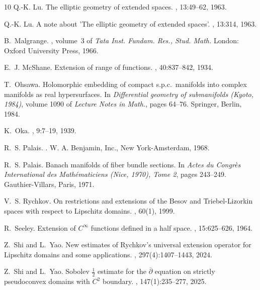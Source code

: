 \documentclass[11pt]{amsart}
\numberwithin{equation}{section}
\theoremstyle{definition}
\begin{document}
\begin{thebibliography}{10}
Q.-K. Lu.
\newblock The elliptic geometry of extended spaces.
, 13:49--62, 1963.

Q.-K. Lu.
\newblock A note about '{The} elliptic geometry of extended spaces'.
, 13:314, 1963.

B.~Malgrange.
, volume~3 of {\em Tata Inst.
  Fundam. Res., Stud. Math.}
\newblock London: Oxford University Press, 1966.

E.~J. McShane.
\newblock Extension of range of functions.
, 40:837--842, 1934.

T.~Ohsawa.
\newblock Holomorphic embedding of compact s.p.c.\ manifolds into complex
  manifolds as real hypersurfaces.
\newblock In {\em Differential geometry of submanifolds ({K}yoto, 1984)},
  volume 1090 of {\em Lecture Notes in Math.}, pages 64--76. Springer, Berlin,
  1984.

K.~{Oka}.
, 9:7--19, 1939.

R.~S. Palais.
.
\newblock W. A. Benjamin, Inc., New York-Amsterdam, 1968.

R.~S. Palais.
\newblock Banach manifolds of fiber bundle sections.
\newblock In {\em Actes du {C}ongr\`es {I}nternational des {M}ath\'ematiciens
  ({N}ice, 1970), {T}ome 2}, pages 243--249. Gauthier-Villars, Paris, 1971.

V.~S. Rychkov.
\newblock On restrictions and extensions of the {Besov} and
  {Triebel}-{Lizorkin} spaces with respect to {Lipschitz} domains.
, 60(1), 1999.

R.~Seeley.
\newblock Extension of {{\(C^ \infty\)}} functions defined in a half space.
, 15:625--626, 1964.

Z.~Shi and L.~Yao.
\newblock New estimates of {Rychkov}'s universal extension operator for
  {Lipschitz} domains and some applications.
, 297(4):1407--1443, 2024.

Z.~Shi and L.~Yao.
\newblock Sobolev {{\(\frac{1}{2}\)}} estimate for the {{\(\overline{\partial}\)}} 
equation on strictly pseudoconvex domains with {{\(C^2\)}} boundary.
, 147(1):235--277, 2025.


\end{thebibliography}
\end{document}
